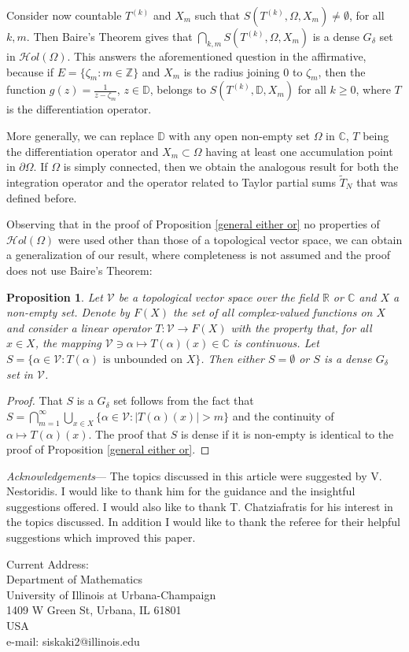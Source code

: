 \documentclass[11pt,twoside,a4paper]{article}
\newtheorem{proposition}[theorem]{Proposition}
\theoremstyle{remark}
\def\d{\delta}
\newcommand{\holo}{{\mathcal Hol}(\Omega)}
\newcommand{\ttn}{\widetilde{T}_N}
\begin{document}
\par
Consider now countable $T^{(k)}$ and $X_m$ such that $S(T^{(k)}, \Omega, X_m) \neq \emptyset$, for all $k,m$. Then Baire's Theorem gives that $\bigcap\limits_{k,m}S(T^{(k)}, \Omega, X_m)$ is a dense $G_\d$ set in $\holo$. This answers the aforementioned question in the affirmative, because if $E=\{\zeta_m : m \in \mathbb{Z}\}$ and $X_m$ is the radius joining $0$ to $\zeta_m$, then the function $g(z)= \frac{1}{z-\zeta_m}$, $z \in \mathbb{D}$, belongs to $S(T^{(k)},\mathbb{D},X_m)$ for all $k \geq 0$, where $T$ is the differentiation operator.
\par
More generally, we can replace $\mathbb{D}$ with any open non-empty set $\Omega$ in $\mathbb{C}$, $T$ being the differentiation operator and $X_m \subset \Omega$ having at least one accumulation point in $\partial \Omega$. If $\Omega $ is simply connected, then we obtain the analogous result for both the integration operator and the operator related to Taylor partial sums $\ttn$ that was defined before.
\par
Observing that in the proof of Proposition \ref{general either or} no properties of $\holo$ were used other than those of a topological vector space, we can obtain a generalization of our result, where completeness is not assumed and the proof does not use Baire's Theorem:
\begin{proposition}
  \label{either or topological vs}
  Let $\mathcal{V}$ be a topological vector space over the field $\mathbb{R}$ or $\mathbb{C}$ and $X$ a non-empty set. Denote by $F(X)$ the set of all complex-valued functions on $X$ and consider a linear operator $T: \mathcal{V} \rightarrow F(X)$ with the property that, for all $x \in X$, the mapping $ \mathcal{V} \ni \alpha \mapsto T(\alpha)(x) \in \mathbb{C}$ is continuous. Let $S=\{\alpha \in \mathcal{V}: T(\alpha) \text{ is unbounded on } X\}$. Then either $S= \emptyset$ or $S$ is a dense $G_\d$ set in $\mathcal{V}$.
\end{proposition}
 \begin{proof}
   That $S$ is a $G_\d$ set follows from the fact that $S = \bigcap\limits_{m=1}^{\infty} \bigcup\limits_{x \in X}\{\alpha \in \mathcal{V}: |T(\alpha)(x)|> m\}$ and the continuity of $\alpha \mapsto T(\alpha)(x)$. The proof that $S$ is dense if it is non-empty is identical to the proof of Proposition \ref{general either or}.
 \end{proof}

\vspace{3pt}
\textit{Acknowledgements}---
The topics discussed in this article were suggested by V. Nestoridis. I would like to thank him for the guidance and the insightful suggestions offered. I would also like to thank T. Chatziafratis for his interest in the topics discussed. In addition I would like to thank the referee for their helpful suggestions which improved this paper.

\nocite{nestoridis_2005}


\begin{flushleft}
Current Address: \\
Department of Mathematics \\
University of Illinois at Urbana-Champaign \\
1409 W Green St, Urbana, IL 61801 \\
USA \\
\vspace{5pt}
e-mail: siskaki2@illinois.edu
\end{flushleft}
\end{document}
